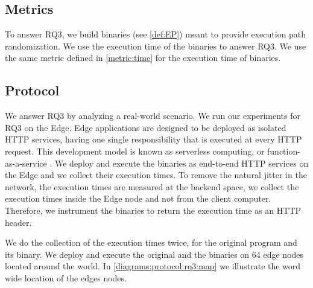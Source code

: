 
\subsection*{Metrics}

To answer RQ3, we build \wasm binaries (see \autoref{def:EP}) meant to provide execution path randomization.
We use the execution time of the binaries to answer RQ3. We use the same metric defined in \autoref{metric:time} for the execution time of binaries.

\subsection*{Protocol}


We answer RQ3 by analyzing a real-world scenario. We run our experiments for RQ3 on the Edge. 
Edge applications are designed to be deployed as isolated HTTP services, having one single responsibility that is executed at every HTTP request. This development model is known as serverless computing, or function-as-a-service \cite{shillaker2020faasm,Narayan2021Swivel}. 
We deploy and execute the binaries as end-to-end HTTP services on the Edge and we collect their execution times.
To remove the natural jitter in the network, the execution times are measured at the backend space, \ie we collect the execution times inside the Edge node and not from the client computer. 
Therefore, we instrument the binaries to return the execution time as an HTTP header. 

We do the collection of the execution times twice, for the original program and its binary. We deploy and execute the original and the binaries on 64 edge nodes located around the world. In \autoref{diagrams:protocol:rq3:map} we illustrate the word wide location of the edges nodes.


